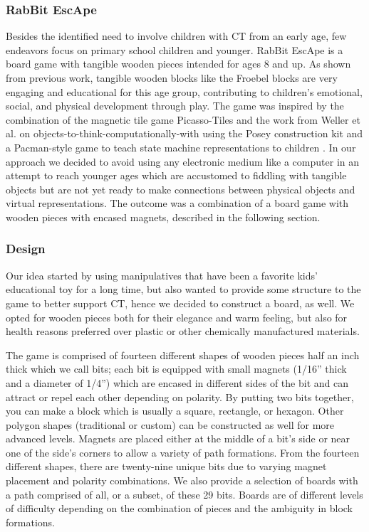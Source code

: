 \documentclass{acm_proc_article-sp}
\begin{document}
\subsubsection{RabBit EscApe}
\label{sec:rabbit}
Besides the identified need to involve children with CT from an early age, few endeavors focus on primary school children and younger.
RabBit EscApe is a board game with tangible wooden pieces intended for ages 8 and up.
As shown from previous work, tangible wooden blocks like the Froebel blocks\cite{liebschner1992child} are very engaging and educational for this age group, contributing to children's emotional, social, and physical development through play.
The game was inspired by the combination of the magnetic tile game Picasso-Tiles\cite{picassotiles3d} and the work from Weller et al. on objects-to-think-computationally-with using the Posey construction kit and a Pacman-style game to teach state machine representations to children \cite{weller2008escape}.
In our approach we decided to avoid using any electronic medium like a computer in an attempt to reach younger ages which are accustomed to fiddling with tangible objects but are not yet ready to make connections between physical objects and virtual representations.
The outcome was a combination of a board game with wooden pieces with encased magnets, described in the following section.

\subsubsection{Design}
\label{sec:design}
Our idea started by using manipulatives that have been a favorite kids' educational toy for a long time, but also wanted to provide some structure to the game to better support CT, hence we decided to construct a board, as well.
We opted for wooden pieces both for their elegance and warm feeling, but also for health reasons preferred over plastic or other chemically manufactured materials. 

The game is comprised of fourteen different shapes of wooden pieces half an inch thick which we call bits; each bit is equipped with small magnets (1/16'' thick and a diameter of 1/4'') which are encased in different sides of the bit and can attract or repel each other depending on polarity.
By putting two bits together, you can make a block which is usually a square, rectangle, or hexagon.
Other polygon shapes (traditional or custom) can be constructed as well for more advanced levels. Magnets are placed either at the middle of a bit's side or near one of the side's corners to allow a variety of path formations.
From the fourteen different shapes, there are twenty-nine unique bits due to varying magnet placement and polarity combinations. We also provide a selection of boards with a path comprised of all, or a subset, of these 29 bits.
Boards are of different levels of difficulty depending on the combination of pieces and the ambiguity in block formations.
\end{document}
